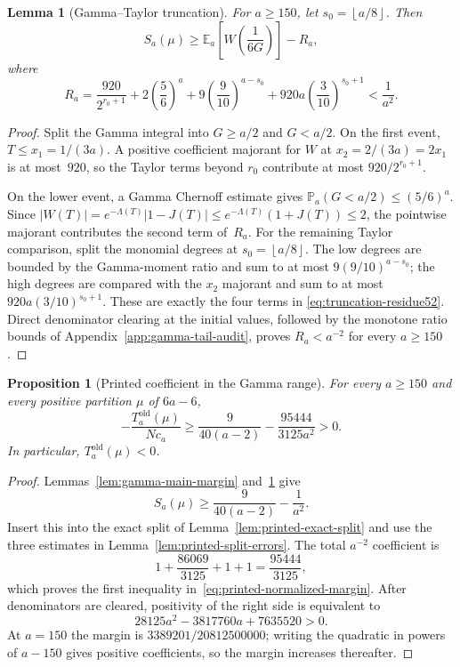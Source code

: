 \documentclass[11pt]{article}
\newtheorem{proposition}[theorem]{Proposition}
\newtheorem{lemma}[theorem]{Lemma}
\theoremstyle{definition}
\theoremstyle{remark}
\newcommand{\floor}[1]{\left\lfloor #1\right\rfloor}
\begin{document}
\begin{lemma}[Gamma--Taylor truncation]\label{lem:gamma-truncation}
For $a\ge150$, let $s_0=\floor{a/8}$.  Then
\begin{equation}\label{eq:truncation-lower52}
 S_a(\mu)\ge
 \mathbb E_a\!\left[W\!\left(\frac1{6G}\right)\right]-R_a,
\end{equation}
where
\begin{equation}\label{eq:truncation-residue52}
 R_a=
 \frac{920}{2^{r_0+1}}
 +2\left(\frac56\right)^a
 +9\left(\frac9{10}\right)^{a-s_0}
 +920a\left(\frac3{10}\right)^{s_0+1}
 <\frac1{a^2}.
\end{equation}
\end{lemma}

\begin{proof}
Split the Gamma integral into $G\ge a/2$ and $G<a/2$.  On the first event,
$T\le x_1=1/(3a)$.  A positive coefficient majorant for $W$ at
$x_2=2/(3a)=2x_1$ is at most~$920$, so the Taylor terms beyond $r_0$ contribute
at most $920/2^{r_0+1}$.

On the lower event, a Gamma Chernoff estimate gives
$\mathbb P_a(G<a/2)\le(5/6)^a$.  Since
$|W(T)|=e^{-\Lambda(T)}|1-J(T)|
 \le e^{-\Lambda(T)}(1+J(T))\le2$,
the pointwise majorant contributes the second term of~$R_a$.
For the remaining Taylor comparison, split the monomial degrees at
$s_0=\floor{a/8}$.  The low degrees are bounded by the Gamma-moment ratio and
sum to at most $9(9/10)^{a-s_0}$; the high degrees are compared with the
$x_2$ majorant and sum to at most
$920a(3/10)^{s_0+1}$.  These are exactly the four terms in
\eqref{eq:truncation-residue52}.  Direct denominator clearing at the initial
values, followed by the monotone ratio bounds of
Appendix~\ref{app:gamma-tail-audit}, proves $R_a<a^{-2}$ for every $a\ge150$.
\end{proof}

\begin{proposition}[Printed coefficient in the Gamma range]
\label{prop:printed-tail}
For every $a\ge150$ and every positive partition $\mu$ of $6a-6$,
\begin{equation}\label{eq:printed-normalized-margin}
 -\frac{T_a^{\mathrm{old}}(\mu)}{Nc_a}
 \ge\frac9{40(a-2)}-\frac{95444}{3125a^2}>0.
\end{equation}
In particular, $T_a^{\mathrm{old}}(\mu)<0$.
\end{proposition}

\begin{proof}
Lemmas~\ref{lem:gamma-main-margin} and~\ref{lem:gamma-truncation} give
\[
  S_a(\mu)\ge\frac9{40(a-2)}-\frac1{a^2}.
\]
Insert this into the exact split of Lemma~\ref{lem:printed-exact-split} and
use the three estimates in Lemma~\ref{lem:printed-split-errors}.  The total
$a^{-2}$ coefficient is
\[
  1+\frac{86069}{3125}+1+1=\frac{95444}{3125},
\]
which proves the first inequality in~\eqref{eq:printed-normalized-margin}.
After denominators are cleared, positivity of the right side is equivalent to
\[
  28125a^2-3817760a+7635520>0.
\]
At $a=150$ the margin is
$3389201/20812500000$; writing the quadratic in powers of $a-150$ gives
positive coefficients, so the margin increases thereafter.
\end{proof}
\end{document}
